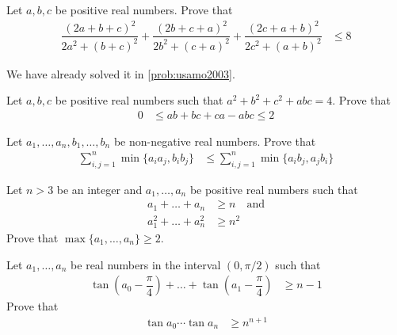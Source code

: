 \documentclass{subfile}
\begin{document}
		\begin{problem}
			Let $a,b,c$ be positive real numbers. Prove that
				\begin{align*}
					\dfrac{(2a+b+c)^{2}}{2a^{2}+(b+c)^{2}}+\dfrac{(2b+c+a)^{2}}{2b^{2}+(c+a)^{2}}+\dfrac{(2c+a+b)^{2}}{2c^{2}+(a+b)^{2}}
						& \leq 8
				\end{align*}
			
				\begin{solution}
					We have already solved it in \autoref{prob:usamo2003}.
				\end{solution}
		\end{problem}
	
		\begin{problem}
			Let $a,b,c$ be positive real numbers such that $a^{2}+b^{2}+c^{2}+abc=4$. Prove that
				\begin{align*}
					0
						& \leq ab+bc+ca-abc\leq 2
				\end{align*}
		\end{problem}
	
		\begin{problem}
			Let $a_{1},\ldots,a_{n},b_{1},\ldots,b_{n}$ be non-negative real numbers. Prove that
				\begin{align*}
					\sum_{i,j=1}^{n}\min\{a_{i}a_{j},b_{i}b_{j}\}
						& \leq\sum_{i,j=1}^{n}\min\{a_{i}b_{j},a_{j}b_{i}\}
				\end{align*}
		\end{problem}
	
		\begin{problem}
			Let $n>3$ be an integer and $a_{1},\ldots,a_{n}$ be positive real numbers such that
				\begin{align*}
					a_{1}+\ldots+a_{n}
						& \geq n\quad\mbox{and}\\
					a_{1}^{2}+\ldots+a_{n}^{2}
						& \geq n^{2}
				\end{align*}
			Prove that $\max\{a_{1},\ldots,a_{n}\}\geq2$.
		\end{problem}
	
		\begin{problem}
			Let $a_{1},\ldots,a_{n}$ be real numbers in the interval $(0,\pi/2)$ such that
				\begin{align*}
					\tan\left(a_{0}-\dfrac{\pi}{4}\right)+\ldots+\tan\left(a_{1}-\dfrac{\pi}{4}\right)
						& \geq n-1
				\end{align*}
			Prove that
				\begin{align*}
					\tan{a_{0}}\cdots\tan{a_{n}}
						& \geq n^{n+1}
				\end{align*}
		\end{problem}
	
\end{document}
